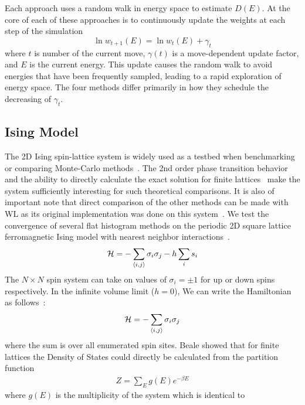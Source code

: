 \documentclass[letterpaper,twocolumn,amsmath,amssymb,pre,aps,10pt]{revtex4-1}
\begin{document}
Each approach uses a random walk in energy space to estimate $D(E)$.  At the
core of each of these approaches is to continuously update the weights at each
step of the simulation
\begin{equation}
	\ln{w_{t+1}(E)}=\ln{w_{t}(E)}
	+\gamma_t
\end{equation}
where $t$ is number of the current move, $\gamma(t)$ is a move-dependent update
factor, and $E$ is the current energy.  This update causes the random walk to
avoid energies that have been frequently sampled, leading to a rapid exploration
of energy space. The four methods differ primarily in how they schedule the
decreasing of $\gamma_t$.

\subsection{Ising Model}
The 2D Ising spin-lattice system is widely used as a testbed when
benchmarking or comparing Monte-Carlo
methods~\cite{ferdinand1969bounded, wang1999transition}. The 2nd order
phase transition behavior and the ability to directly calculate the
exact solution for finite lattices~\cite{beale1996exact} make the
system sufficiently interesting for such theoretical comparisons. It is
also of important note that direct comparison of the other methods can
be made with WL as its original implementation was done on this
system~\cite{wang2001determining,wang2001efficient}.
We test the convergence of several flat histogram methods
on the periodic 2D square lattice ferromagnetic Ising model with nearest
neighbor interactions~\cite{landau2004new}.
\begin{align}
\mathcal{H} = -\sum_{\braket{i,j}} \sigma_i \sigma_j - h \sum_i s_i
\end{align}
The $N\times N$ spin system can take on values of $\sigma_i = \pm 1$
for up or down spins respectively. In the infinite volume limit ($h =
0$), We can write the Hamiltonian as follows~\cite{onsager1944crystal,
kaufman1949crystal}:
\begin{align}
\mathcal{H} = -\sum_{\braket{i,j}} \sigma_i \sigma_j
\end{align}
where the sum is over all enumerated spin sites. Beale showed that for finite
lattices the Density of States could directly be calculated from the partition
function~\cite{beale1996exact}
\begin{align}
Z = \sum_E g(E) e^{-{\beta E}}
\end{align}
where $g(E)$ is the multiplicity of the system which is identical to
\end{document}
